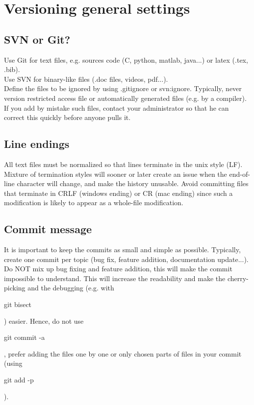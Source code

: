 \pagebreak
\section{Versioning general settings}


\subsection{SVN or Git?}
Use Git for text files, e.g. sources code (C, python, matlab, java...) or latex (.tex, .bib).\\
Use SVN for binary-like files (.doc files, videos, pdf...).\\
Define the files to be ignored by using .gitignore or svn:ignore. 
Typically, never version restricted access file or automatically generated files (e.g. by a compiler).
If you add by mistake such files, contact your administrator so that he can correct this quickly before anyone pulls it.

%

\subsection{Line endings}
All text files must be normalized so that lines terminate in the unix style (LF).
Mixture of termination styles will sooner or later create an issue when the end-of-line character will change, and make the history unusable.
Avoid committing files that terminate in CRLF (windows ending) or CR (mac ending) since such a modification is likely to appear as a whole-file modification.

\subsection{Commit message}

It is important to keep the commits as small and simple as possible.
Typically, create one commit per topic (bug fix, feature addition,  documentation update...).
Do NOT mix up bug fixing and feature addition, this will make the commit impossible to understand.
This will increase the readability and make the cherry-picking and the debugging (e.g. with \begin{tt}git bisect\end{tt}) easier.
Hence, do not use \begin{tt}git commit -a\end{tt}, prefer adding the files one by one or only chosen parts of files in your commit (using \begin{tt}git add -p\end{tt}).

